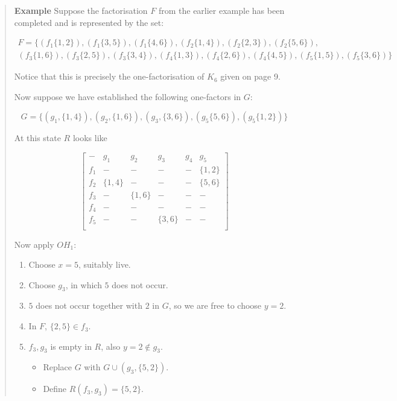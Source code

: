 \documentclass[
  11pt,
  a4paper]{book}
\newcounter{examplecounter}
\begin{document}
\begin{quote}  \textbf{Example } \quad 
Suppose the factorisation $F$ from the earlier example has
been completed and is represented by the set:

\begin{equation}
  \begin{split}
    F = \{(f_1\{1,2\}),(f_1\{3,5\}),(f_1\{4,6\}),(f_2\{1,4\}),(f_2\{2,3\}),(f_2\{5,6\}), \\
    (f_3\{1,6\}),(f_3\{2,5\}),(f_3\{3,4\}),(f_4\{1,3\}),(f_4\{2,6\}),(f_4\{4,5\}),(f_5\{1,5\}),(f_5\{3,6\})\}
  \end{split}
\end{equation}

Notice that this is precisely the one-factorisation of $K_6$
given on page 9.

Now suppose we have established the following one-factors in
$G$:

\begin{equation}
  G = \{(g_1, \{1, 4\}), (g_2, \{1, 6\}), (g_3, \{3, 6\}), (g_5\{5, 6\}), (g_5\{1, 2\})\}
\end{equation}

At this state $R$ looks like 

\begin{equation}
  \begin{bmatrix}
     -  &   g_1    &    g_2    &    g_3   & g_4 &    g_5    \\
    f_1 &     -    &     -     &    -     &  -  & \{1, 2\}  \\
    f_2 & \{1, 4\} &     -     &    -     &  -  & \{5, 6\}  \\
    f_3 &     -    &  \{1, 6\} &    -     &  -  &     -     \\
    f_4 &     -    &     -     &    -     &  -  &     -     \\
    f_5 &     -    &     -     & \{3, 6\} &  -  &     -     \\
  \end{bmatrix}
\end{equation}

Now apply $OH_1$:

\begin{enumerate}
  \item{Choose $x = 5$, suitably live.}
  \item{Choose $g_3$, in which $5$ does not occur.}
  \item{$5$ does not occur together with $2$ in $G$, so we are
     free to choose $y = 2$.}
  \item{In $F$, $\{2, 5\} \in f_3$.}
  \item{
    $f_3, g_3$ is empty in $R$, also $y = 2 \notin g_3$.
    \begin{itemize}
       \item{Replace $G$ with $G \cup (g_3, \{5, 2\})$.}
       \item{Define $R(f_3, g_3) = \{5, 2\}$.}
    \end{itemize}
  }
\end{enumerate}


\end{quote}
\end{document}
